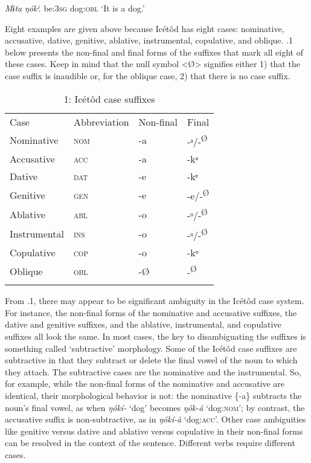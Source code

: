 \textit{Mɨta}     \textit{ŋók}\textit{ⁱ}.
be:\textsc{3sg}  dog:\textsc{obl}
‘It is a dog.’


Eight examples are given above because Icétôd has eight cases: nominative, accusative, dative, genitive, ablative, instrumental, copulative, and oblique. .1 below presents the non-final and final forms of the suffixes that mark all eight of these cases. Keep in mind that the null symbol <Ø> signifies either 1) that the case suffix is inaudible or, for the oblique case, 2) that there is no case suffix. 


\begin{table}
\caption{1: Icétôd case suffixes}
\label{tab:7}


\begin{tabularx}{\textwidth}{XXXX}
\lsptoprule

Case & Abbreviation & Non-final & Final\\
Nominative & \textsc{nom} & {}-a & {}-ᵃ/-\textsuperscript{Ø}\\
Accusative & \textsc{acc} & {}-a & {}-kᵃ\\
Dative & \textsc{dat} & {}-e & {}-kᵉ\\
Genitive & \textsc{gen} & {}-e & {}-e/-\textsuperscript{Ø}\\
Ablative & \textsc{abl} & {}-o & {}-ᵒ/-\textsuperscript{Ø}\\
Instrumental & \textsc{ins} & {}-o & {}-ᵒ/-\textsuperscript{Ø}\\
Copulative & \textsc{cop} & {}-o & {}-kᵒ\\
Oblique & \textsc{obl} & {}-Ø & {}-\textsuperscript{Ø}\\
\lspbottomrule
\end{tabularx}
\end{table}
From .1, there may appear to be significant ambiguity in the Icétôd case system. For instance, the non-final forms of the nominative and accusative suffixes, the dative and genitive suffixes, and the ablative, instrumental, and copulative suffixes all look the same. In most cases, the key to disambiguating the suffixes is something called ‘subtractive’\textsc{} morphology. Some of the Icétôd case suffixes are subtractive in that they subtract or delete the final vowel of the noun to which they attach. The subtractive cases are the nominative and the instrumental. So, for example, while the non-final forms of the nominative and accusative are identical, their morphological behavior is not: the nominative \{-a\} subtracts the noun’s final vowel, as when \textit{ŋókí-} ‘dog’ becomes \textit{ŋók-á} ‘dog:\textsc{nom}’; by contrast, the accusative suffix is non-subtractive, as in \textit{ŋókí-à} ‘dog:\textsc{acc}’. Other case ambiguities like genitive versus dative and ablative versus copulative in their non-final forms can be resolved in the context of the sentence. Different verbs require different cases.

